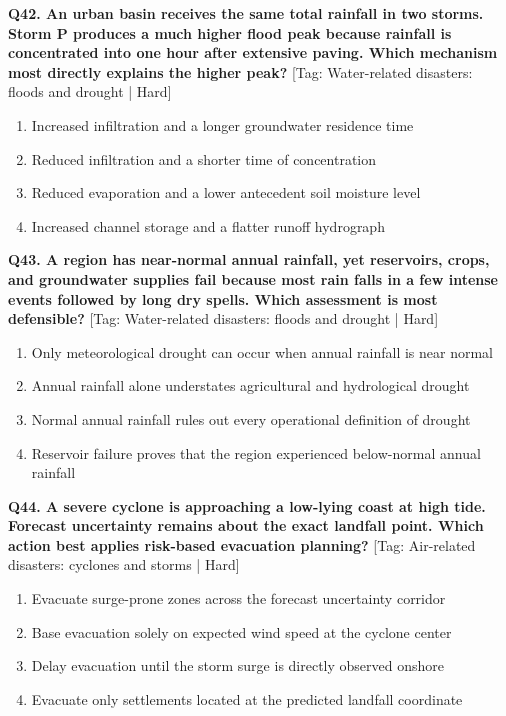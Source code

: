 \noindent\textbf{Q42. An urban basin receives the same total rainfall in two storms. Storm P produces a much higher flood peak because rainfall is concentrated into one hour after extensive paving. Which mechanism most directly explains the higher peak?} \hfill [Tag: Water-related disasters: floods and drought | Hard]
\begin{enumerate}[label=(\alph*),topsep=2pt,itemsep=1pt,partopsep=0pt,parsep=0pt]
    \item {Increased infiltration and a longer groundwater residence time}
    \item {Reduced infiltration and a shorter time of concentration}
    \item {Reduced evaporation and a lower antecedent soil moisture level}
    \item {Increased channel storage and a flatter runoff hydrograph}
\end{enumerate}
\vspace{2mm}

\noindent\textbf{Q43. A region has near-normal annual rainfall, yet reservoirs, crops, and groundwater supplies fail because most rain falls in a few intense events followed by long dry spells. Which assessment is most defensible?} \hfill [Tag: Water-related disasters: floods and drought | Hard]
\begin{enumerate}[label=(\alph*),topsep=2pt,itemsep=1pt,partopsep=0pt,parsep=0pt]
    \item {Only meteorological drought can occur when annual rainfall is near normal}
    \item {Annual rainfall alone understates agricultural and hydrological drought}
    \item {Normal annual rainfall rules out every operational definition of drought}
    \item {Reservoir failure proves that the region experienced below-normal annual rainfall}
\end{enumerate}
\vspace{2mm}

\noindent\textbf{Q44. A severe cyclone is approaching a low-lying coast at high tide. Forecast uncertainty remains about the exact landfall point. Which action best applies risk-based evacuation planning?} \hfill [Tag: Air-related disasters: cyclones and storms | Hard]
\begin{enumerate}[label=(\alph*),topsep=2pt,itemsep=1pt,partopsep=0pt,parsep=0pt]
    \item {Evacuate surge-prone zones across the forecast uncertainty corridor}
    \item {Base evacuation solely on expected wind speed at the cyclone center}
    \item {Delay evacuation until the storm surge is directly observed onshore}
    \item {Evacuate only settlements located at the predicted landfall coordinate}
\end{enumerate}
\vspace{2mm}

